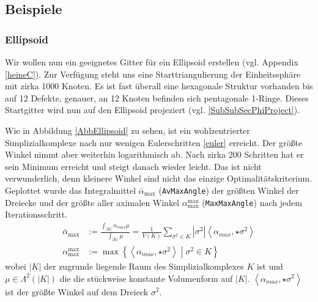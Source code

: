   
  \subsection{Beispiele}
    
    \subsubsection{Ellipsoid}
      Wir wollen nun ein geeignetes Gitter für ein Ellipsoid erstellen (vgl. Appendix \ref{heineC}).
      Zur Verfügung steht uns eine Starttriangulierung der Einheitssphäre mit zirka 1000 Knoten.
      Es ist fast überall eine hexagonale Struktur vorhanden bis auf 12 Defekte, genauer, an 12 Knoten
      befinden sich pentagonale 1-Ringe. 
      Dieses Startgitter wird nun auf den Ellipsoid projeziert (vgl. \ref{SubSubSecPhiProject}).
      
      Wie in Abbildung \ref{AbbEllipsoid} zu sehen, ist ein wohlzentrierter Simplizialkomplexe nach nur
      wenigen Eulerschritten \eqref{euler} erreicht. 
      Der größte Winkel nimmt aber weiterhin logarithmisch ab. 
      Nach zirka 200 Schritten hat er sein Minimum erreicht und steigt danach wieder leicht.
      Das ist nicht verwunderlich, denn kleinere Winkel sind nicht das einzige Optimalitätskriterium.
      Geplottet wurde das Integralmittel \( \bar{\alpha}_{\max} \) (\texttt{AvMaxAngle}) der größten Winkel der Dreiecke
      und der größte aller aximalen Winkel \(\alpha_{\max}^{\max} \) (\texttt{MaxMaxAngle}) nach jedem Iterationsschritt.
      \begin{align}
         \bar{\alpha}_{\max} &:= \frac{\int_{|K|}\alpha_{max}\mu}{\int_{|K|}\mu}
                              = \frac{1}{V(K)} \sum_{\sigma^{2}\in K} |\sigma^{2}| \left< \alpha_{max}, \star\sigma^{2} \right> \\
         \alpha_{\max}^{\max} &:= \max\left\{ \left< \alpha_{max}, \star\sigma^{2} \right> \middle| \sigma^{2} \in K \right\}
      \end{align}
      wobei \( |K| \) der zugrunde liegende Raum des Simplizialkomplexes \( K \) ist 
      und \( \mu\in\Lambda^{2}(|K|) \) die die stückweise konstante Volumenform auf \( |K| \).
      \( \left< \alpha_{max}, \star\sigma^{2} \right> \) ist der größte Winkel auf dem Dreieck \( \sigma^{2} \).

